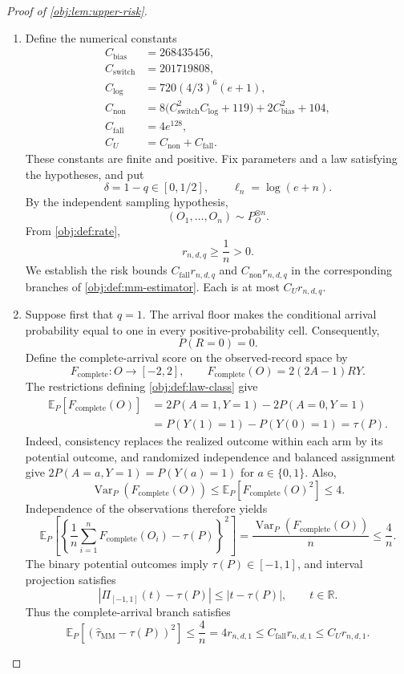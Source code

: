 \documentclass[11pt]{article}
\begin{document}
\begin{proof}[Proof of \cref{obj:lem:upper-risk}]
\begin{enumerate}
\item Define the numerical constants
\[
\begin{aligned}
C_{\mathrm{bias}}&=268435456,\\
C_{\mathrm{switch}}&=201719808,\\
C_{\mathrm{log}}&=720(4/3)^6(e+1),\\
C_{\mathrm{non}}&=
8\bigl(C_{\mathrm{switch}}^2C_{\mathrm{log}}+119\bigr)
+2C_{\mathrm{bias}}^2+104,\\
C_{\mathrm{fall}}&=4e^{128},\\
C_U&=C_{\mathrm{non}}+C_{\mathrm{fall}}.
\end{aligned}
\]
These constants are finite and positive. Fix parameters and a law satisfying the hypotheses, and put
\[
\delta=1-q\in[0,1/2],
\qquad
\ell_n=\log(e+n).
\]
By the independent sampling hypothesis,
\[
(O_1,\ldots,O_n)\sim P_O^{\otimes n}.
\]
From \cref{obj:def:rate},
\[
r_{n,d,q}\ge \frac1n>0.
\]
We establish the risk bounds \(C_{\mathrm{fall}}r_{n,d,q}\) and
\(C_{\mathrm{non}}r_{n,d,q}\) in the corresponding branches of
\cref{obj:def:mm-estimator}. Each is at most \(C_Ur_{n,d,q}\).

\item Suppose first that \(q=1\). The arrival floor makes the conditional arrival probability equal to one in every positive-probability cell. Consequently,
\[
P(R=0)=0.
\]
Define the complete-arrival score on the observed-record space by
\[
F_{\mathrm{complete}}:O\longrightarrow[-2,2],
\qquad
F_{\mathrm{complete}}(O)=2(2A-1)RY.
\]
The restrictions defining \cref{obj:def:law-class} give
\[
\begin{aligned}
\mathbb E_P[F_{\mathrm{complete}}(O)]
&=2P(A=1,Y=1)-2P(A=0,Y=1)\\
&=P(Y(1)=1)-P(Y(0)=1)
=\tau(P).
\end{aligned}
\]
Indeed, consistency replaces the realized outcome within each arm by its potential outcome, and randomized independence and balanced assignment give
\(2P(A=a,Y=1)=P(Y(a)=1)\) for \(a\in\{0,1\}\).
Also,
\[
\operatorname{Var}_P(F_{\mathrm{complete}}(O))
\le \mathbb E_P[F_{\mathrm{complete}}(O)^2]\le4.
\]
Independence of the observations therefore yields
\[
\mathbb E_P\!\left[
\left\{\frac1n\sum_{i=1}^nF_{\mathrm{complete}}(O_i)-\tau(P)\right\}^2
\right]
=\frac{\operatorname{Var}_P(F_{\mathrm{complete}}(O))}{n}
\le\frac4n.
\]
The binary potential outcomes imply \(\tau(P)\in[-1,1]\), and interval projection satisfies
\[
\left|\Pi_{[-1,1]}(t)-\tau(P)\right|
\le |t-\tau(P)|,
\qquad t\in\mathbb R.
\]
Thus the complete-arrival branch satisfies
\[
\mathbb E_P[(\widehat\tau_{\mathrm{MM}}-\tau(P))^2]
\le \frac4n
=4r_{n,d,1}
\le C_{\mathrm{fall}}r_{n,d,1}
\le C_Ur_{n,d,1}.
\]


\end{enumerate}
\end{proof}
\end{document}
